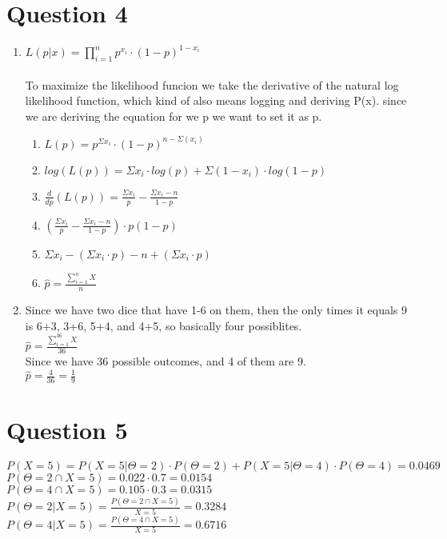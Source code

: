 \documentclass{article}
\begin{document}
\section*{Question 4}
\begin{enumerate}
    \item $L(p|x) = \prod_{i=1}^{n} p^{x_i} \cdot (1-p)^{1-x_i}$
    \\\\To maximize the likelihood funcion we take the derivative of the natural log likelihood function, which kind of also means logging and 
    deriving P(x). since we are deriving the equation for we p we want to set it as p.
    \begin{enumerate}[label=\Roman*]
        \item  $L(p) = p^{\Sigma x_i} \cdot (1-p)^{n-\Sigma (x_i)}$
        \item  $log(L(p)) = \Sigma x_i \cdot log(p) + \Sigma (1-x_i) \cdot log(1-p)$
        \item $\frac{d}{dp}(L(p)) = \frac{\Sigma x_i}{p} - \frac{\Sigma x_i - n}{1-p}$
        \item $(\frac{\Sigma x_i}{p} - \frac{\Sigma x_i - n}{1-p}) \cdot p(1-p)$
        \item $\Sigma x_i-(\Sigma x_i \cdot p) - n+ (\Sigma x_i \cdot p)$
        \item $\hat{p} = \frac{\sum_{i=1}^{n} X}{n}$
    \end{enumerate}
    \item Since we have two dice that have 1-6 on them, then the only times it equals 9 is 6+3, 3+6, 5+4, and 4+5, so basically four possiblites.
    \\$\hat{p} = \frac{\sum_{i=1}^{36} X}{36}$
    \\Since we have 36 possible outcomes, and 4 of them are 9.
    \\$\hat{p} = \frac{4}{36} = \frac{1}{9}$
\end{enumerate}

\section*{Question 5}
$P(X = 5) =  P(X=5 | \Theta=2) \cdot P(\Theta=2) + P(X=5|\Theta=4) \cdot P(\Theta=4) = 0.0469$
\\$P(\Theta =2 \cap X = 5) = 0.022 \cdot 0.7 = 0.0154$
\\$P(\Theta =4 \cap X = 5) = 0.105 \cdot 0.3 = 0.0315$
\\$P(\Theta = 2 | X=5) = \frac{P(\Theta =2 \cap X = 5)}{X=5} =0.3284$
\\$P(\Theta = 4 | X=5) = \frac{P(\Theta =4 \cap X = 5)}{X=5} =0.6716$
\end{document}
